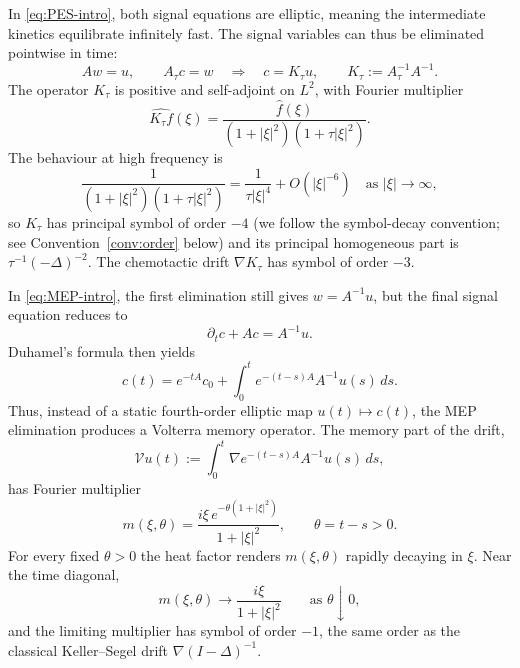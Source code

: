 \documentclass[11pt,reqno]{amsart}
\theoremstyle{definition}
\theoremstyle{remark}
\newcommand{\Vop}{\mathcal{V}}
\begin{document}
In \eqref{eq:PES-intro}, both signal equations are elliptic, meaning the intermediate kinetics equilibrate infinitely fast. The signal variables can thus be eliminated pointwise in time:
\begin{equation}\label{eq:PES-elimination}
        A w=u,\qquad A_\tau c=w
        \quad\Longrightarrow\quad
        c=K_\tau u,\qquad
        K_\tau:=A_\tau^{-1}A^{-1}.
\end{equation}
The operator $K_\tau$ is positive and self-adjoint on $L^{2}$, with Fourier multiplier
\begin{equation}\label{eq:Ktau-multiplier-intro}
        \widehat{K_\tau f}(\xi)
        =
        \frac{\widehat f(\xi)}{(1+|\xi|^{2})(1+\tau|\xi|^{2})}.
\end{equation}
The behaviour at high frequency is
\begin{equation}\label{eq:Ktau-asymptotic-intro}
        \frac{1}{(1+|\xi|^{2})(1+\tau|\xi|^{2})}
        =
        \frac{1}{\tau|\xi|^{4}}
        +
        O(|\xi|^{-6})
        \quad\text{as }|\xi|\to\infty,
\end{equation}
so $K_\tau$ has principal symbol of order $-4$ (we follow the symbol-decay convention; see Convention~\ref{conv:order} below) and its principal homogeneous part is $\tau^{-1}(-\Delta)^{-2}$. The chemotactic drift $\nabla K_\tau$ has symbol of order $-3$.

In \eqref{eq:MEP-intro}, the first elimination still gives $w=A^{-1}u$, but the final signal equation reduces to
\begin{equation}\label{eq:MEP-signal-eq-intro}
        \partial_t c+A c=A^{-1}u.
\end{equation}
Duhamel's formula then yields
\begin{equation}\label{eq:MEP-Duhamel-intro}
        c(t)=e^{-tA}c_0
        +\int_{0}^{t}e^{-(t-s)A}A^{-1}u(s)\,ds.
\end{equation}
Thus, instead of a static fourth-order elliptic map $u(t)\mapsto c(t)$, the MEP elimination produces a Volterra memory operator. The memory part of the drift,
\begin{equation}\label{eq:MEP-Volterra-drift-intro}
        \Vop u(t):=\int_{0}^{t}\nabla e^{-(t-s)A}A^{-1}u(s)\,ds,
\end{equation}
has Fourier multiplier
\begin{equation}\label{eq:MEP-multiplier-intro}
        m(\xi,\theta)
        =\frac{i\xi\,e^{-\theta(1+|\xi|^{2})}}{1+|\xi|^{2}},
        \qquad \theta=t-s>0.
\end{equation}
For every fixed $\theta>0$ the heat factor renders $m(\xi,\theta)$ rapidly decaying in $\xi$. Near the time diagonal,
\begin{equation}\label{eq:MEP-near-diagonal-intro}
        m(\xi,\theta)\longrightarrow\frac{i\xi}{1+|\xi|^{2}}
        \qquad\text{as }\theta\downarrow 0,
\end{equation}
and the limiting multiplier has symbol of order $-1$, the same order as the classical Keller--Segel drift $\nabla(I-\Delta)^{-1}$.
\end{document}
